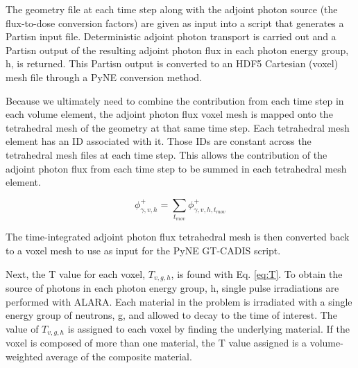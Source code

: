 The geometry file at each time step along with the adjoint photon source (the
flux-to-dose conversion factors) are given as input into a script that
generates a Partisn input file.  Deterministic adjoint photon transport is
carried out and a Partisn output of the resulting adjoint photon flux in each
photon energy group, h, is
returned.  This Partisn output is converted to an HDF5 Cartesian (voxel) mesh file
through a PyNE conversion method.  

Because we ultimately need to combine the contribution from each time step in each
volume element, the adjoint photon flux voxel mesh is mapped onto the
tetrahedral mesh of the geometry at that same time step.  Each tetrahedral
mesh element has an ID associated with it.  Those IDs are constant across the
tetrahedral mesh files at each time step.  This allows the contribution of the adjoint photon 
flux from each time step to be summed in each tetrahedral mesh element.

\begin{equation}\label{eq:sum}
	\phi_{\gamma,v, h}^{+} = \sum_{t_{mov}}{\phi_{\gamma,v,h,t_{mov}}^{+}}
\end{equation}

The time-integrated 
adjoint photon flux tetrahedral mesh is then converted back to a voxel mesh
to use as input for the PyNE GT-CADIS script. 

Next, the T value for each voxel, $T_{v,g,h}$,
 is found with Eq.
\ref{eq:T}.
To obtain the source of photons in each photon energy group, h, 
single pulse irradiations are performed with ALARA.
Each material in the problem is irradiated with a single energy group of
neutrons, g, and allowed to decay to the time of interest.  The value
of $T_{v,g,h}$ is assigned to each voxel by finding the underlying material.
If the voxel is composed of more than one material, the T value assigned is
a volume-weighted average of the composite material.

